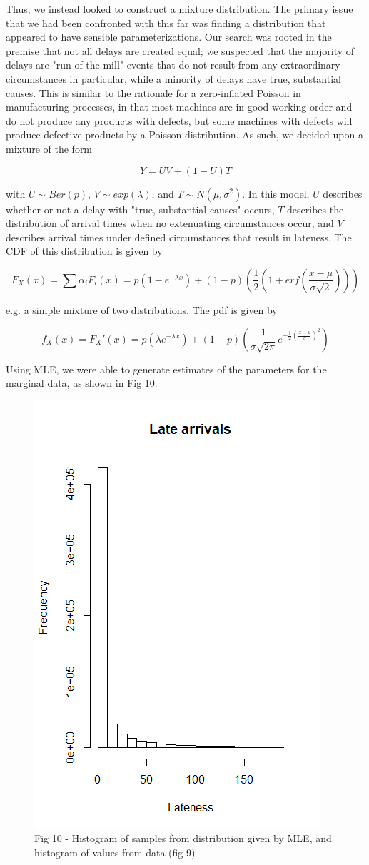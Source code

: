 \documentclass[12pt, a4paper, openany]{book}
\newcommand\tab[1][1cm]{\hspace*{#1}}
\begin{document}
	\tab Thus, we instead looked to construct a mixture distribution. The primary issue that we had been confronted with this far was finding a distribution that appeared to have sensible parameterizations.  Our search was rooted in the premise that not all delays are created equal;  we suspected that the majority of delays are "run-of-the-mill" events that do not result from any extraordinary circumstances in particular, while a minority of delays have true, substantial causes. This is similar to the rationale for a zero-inflated Poisson in manufacturing processes, in that most machines are in good working order and do not produce any products with defects, but some machines with defects will produce defective products by a Poisson distribution. As such, we decided upon a mixture of the form \begin{center}$$Y = UV + (1-U)T$$\end{center} with $U\sim Ber(p)$, $V\sim exp(\lambda)$, and $T\sim  N(\mu,\sigma^2)$. In this model, $U$ describes whether or not a delay with "true, substantial causes" occurs, $T$ describes the distribution of arrival times when no extenuating circumstances occur, and $V$ describes arrival times under defined circumstances that result in lateness. The CDF of this distribution is given by 
	\begin{center}$$F_X(x) = \sum \alpha_i F_i(x) = p(1-e^{-\lambda x}) + (1-p)\left(\frac{1}{2}(1+ erf(\frac{x-\mu}{\sigma\sqrt{2}}))\right)$$\end{center}
	e.g. a simple mixture of two distributions. The pdf is given by \begin{center}
	$$f_X(x) = F_X'(x) = p(\lambda e^{-\lambda x} ) + (1-p)\left(\frac{1}{\sigma \sqrt{2\pi}} e^{-\frac{1}{2}(\frac{x-\mu}{\sigma})^2}\right)$$
	\end{center}
	Using MLE, we were able to generate estimates of the parameters for the marginal data, as shown in \underline{Fig 10}.\\
			\begin{figure}
			\centering
	 		\includegraphics[width = .45 \textwidth]{../figures/LateArrivalsHistogram}
	 		\caption{Fig 10 - Histogram of samples from distribution given by MLE, and histogram of values from data (fig 9)}
	 		\end{figure}
\end{document}
